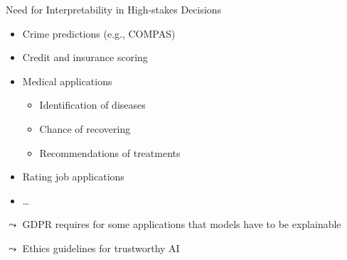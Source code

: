 \documentclass[11pt,compress,t,notes=noshow, aspectratio=169, xcolor=table]{beamer}
\begin{document}
\begin{frame}{Need for Interpretability in High-stakes Decisions}

    \begin{itemize}
        \item Crime predictions (e.g., COMPAS)
        
        \item Credit and insurance scoring

        \item Medical applications %
        \begin{itemize}
            \item Identification of diseases
            \item Chance of recovering
            \item Recommendations of treatments
        \end{itemize}

        \item Rating job applications

        \item \ldots
    \end{itemize}


    \bigskip

    $\leadsto$ GDPR requires for some applications that models have to be explainable
    
    $\leadsto$ Ethics guidelines for trustworthy AI 

\end{frame}





\end{document}
